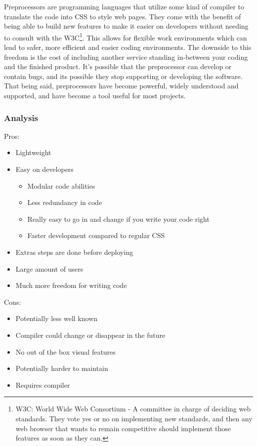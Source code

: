 \documentclass[draftclsnofoot,onecolumn,letterpaper,10pt,compsoc]{IEEEtran}
\begin{document}
    Preprocessors are programming languages that utilize some kind of compiler to translate the code into CSS to style web pages.
    They come with the benefit of being able to build new features to make it easier on developers without needing to consult with the W3C\footnote{W3C: World Wide Web Consortium - A committee in charge of deciding web standards. They vote yes or no on implementing new standards, and then any web browser that wants to remain competitive should implement those features as soon as they can.}.
    This allows for flexible work environments which can lead to safer, more efficient and easier coding environments.
    The downside to this freedom is the cost of including another service standing in-between your coding and the finished product.
    It's possible that the preprocessor can develop or contain bugs, and its possible they stop supporting or developing the software.
    That being said, preprocessors have become powerful, widely understood and supported, and have become a tool useful for most projects.

  	\subsubsection{Analysis}

    Pros:
    \begin{itemize}
      \item Lightweight
      \item Easy on developers
      \begin{itemize}
        \item Modular code abilities
        \item Less redundancy in code
        \item Really easy to go in and change if you write your code right
        \item Faster development compared to regular CSS
      \end{itemize}
      \item Extras steps are done before deploying
      \item Large amount of users
      \item Much more freedom for writing code
    \end{itemize}

    Cons:
    \begin{itemize}
      \item Potentially less well known
      \item Compiler could change or disappear in the future
      \item No out of the box visual features
      \item Potentially harder to maintain
      \item Requires compiler
    \end{itemize}
\end{document}
